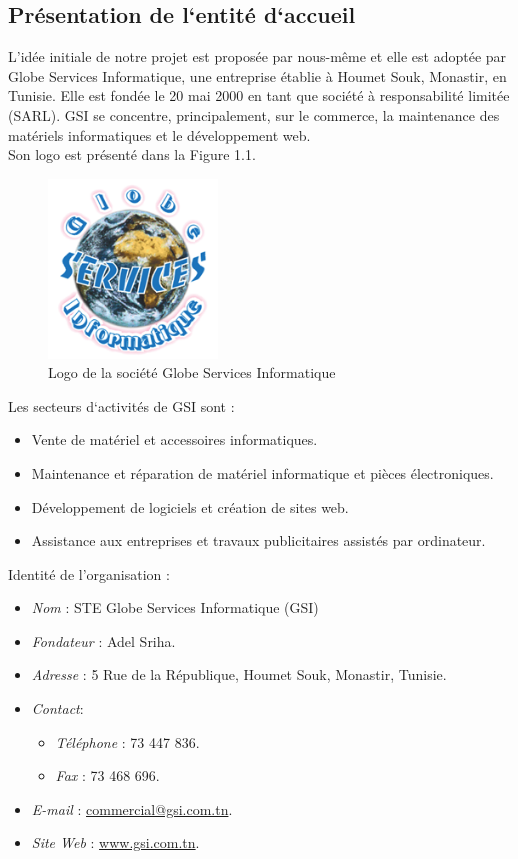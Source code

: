 \subsection{Présentation de l`entité d`accueil}
L’idée initiale de notre projet est proposée par nous-même et elle est adoptée par  Globe Services Informatique, une entreprise établie à Houmet Souk, Monastir, en Tunisie. Elle est fondée le 20 mai 2000 en tant que société à responsabilité limitée (SARL). GSI se concentre, principalement, sur le commerce, la maintenance des matériels informatiques et le développement web.\\
Son logo est présenté dans la Figure 1.1.
\begin{figure}[H]
    \centering
    \includegraphics[width=0.4\textwidth,height=0.4\textwidth]{images/gsi-logo.png}
    \caption{Logo de la société  Globe Services Informatique }
    \label{fig:gsi-logo}    
\end{figure}

\noindent Les secteurs d`activités de GSI sont :
\begin{itemize}[itemsep=2pt, parsep=2pt]
    \item Vente de matériel et accessoires informatiques.
    \item Maintenance et réparation de matériel informatique et pièces électroniques.
    \item Développement de logiciels et création de sites web.
    \item Assistance aux entreprises et travaux publicitaires assistés par ordinateur.
\end{itemize}

\noindent Identité de l'organisation :
\begin{itemize}[itemsep=2pt, parsep=2pt]
    \item \textit{Nom} : STE Globe Services Informatique (GSI)
    \item \textit{Fondateur} : Adel Sriha.
    \item \textit{Adresse} : 5 Rue de la République, Houmet Souk, Monastir, Tunisie.
    \item \textit{Contact}: 
    \begin{itemize}[itemsep=2pt, parsep=2pt]
        \item \textit{Téléphone} : 73 447 836.
        \item \textit{Fax} : 73 468 696.
    \end{itemize}
    \item \textit{E-mail} : \href{mailto:commercial@gsi.com.tn}{commercial@gsi.com.tn}.
    \item \textit{Site Web} : \href{https://www.gsi.com.tn/}{www.gsi.com.tn}.
\end{itemize}

